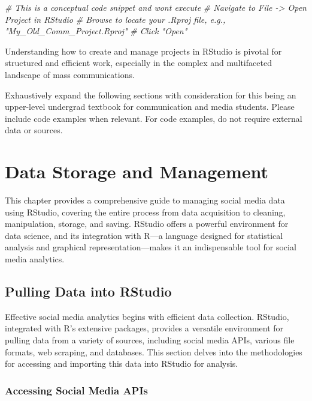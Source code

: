 \documentclass[
]{book}
\newenvironment{Shaded}{\begin{snugshade}}{\end{snugshade}}
\newcommand{\CommentTok}[1]{\textcolor[rgb]{0.56,0.35,0.01}{\textit{#1}}}
\begin{document}
\begin{Shaded}
\begin{Highlighting}[]
\CommentTok{\# This is a conceptual code snippet and won\textquotesingle{}t execute}
\CommentTok{\# Navigate to File {-}\textgreater{} Open Project in RStudio}
\CommentTok{\# Browse to locate your .Rproj file, e.g., "My\_Old\_Comm\_Project.Rproj"}
\CommentTok{\# Click "Open"}
\end{Highlighting}
\end{Shaded}

Understanding how to create and manage projects in RStudio is pivotal for structured and efficient work, especially in the complex and multifaceted landscape of mass communications.

Exhaustively expand the following sections with consideration for this being an upper-level undergrad textbook for communication and media students. Please include code examples when relevant. For code examples, do not require external data or sources.

\hypertarget{data-storage-and-management}{%
\chapter{Data Storage and Management}\label{data-storage-and-management}}

This chapter provides a comprehensive guide to managing social media data using RStudio, covering the entire process from data acquisition to cleaning, manipulation, storage, and saving. RStudio offers a powerful environment for data science, and its integration with R---a language designed for statistical analysis and graphical representation---makes it an indispensable tool for social media analytics.

\hypertarget{pulling-data-into-rstudio}{%
\section{Pulling Data into RStudio}\label{pulling-data-into-rstudio}}

Effective social media analytics begins with efficient data collection. RStudio, integrated with R's extensive packages, provides a versatile environment for pulling data from a variety of sources, including social media APIs, various file formats, web scraping, and databases. This section delves into the methodologies for accessing and importing this data into RStudio for analysis.

\hypertarget{accessing-social-media-apis}{%
\subsection{Accessing Social Media APIs}\label{accessing-social-media-apis}}
\end{document}

